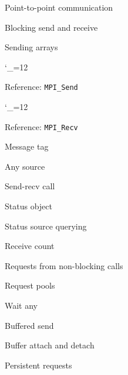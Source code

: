 \documentclass[11pt,headernav]{beamer}
\newcommand\referenceframe{\begingroup\catcode`\_=12 \referenceframett}
\gdef\referenceframett#1{
  \begin{numberedframe}{Reference: \texttt{MPI_#1}}
    \small
    
  \end{numberedframe}\endgroup}
\begin{document}
 {Point-to-point communication}

\begin{numberedframe}{Blocking send and receive}
  
\end{numberedframe}
\begin{numberedframe}{Sending arrays}
  
\end{numberedframe}
\referenceframe{Send}
\referenceframe{Recv}
\begin{numberedframe}{Message tag}
  
\end{numberedframe}
\begin{numberedframe}{Any source}
  
\end{numberedframe}
\begin{numberedframe}{Send-recv call}
  
\end{numberedframe}
\begin{numberedframe}{Status object}
  
\end{numberedframe}
\begin{numberedframe}{Status source querying}
  
\end{numberedframe}
\begin{numberedframe}{Receive count}
  
\end{numberedframe}

\begin{numberedframe}{Requests from non-blocking calls}
  
\end{numberedframe}
\begin{numberedframe}{Request pools}
  
\end{numberedframe}
\begin{numberedframe}{Wait any}
  
\end{numberedframe}
\begin{exerciseframe}[setdiff]
  
\end{exerciseframe}

\begin{numberedframe}{Buffered send}
  
\end{numberedframe}
\begin{numberedframe}{Buffer attach and detach}
  
\end{numberedframe}
\begin{numberedframe}{Persistent requests}
  
\end{numberedframe}
\end{document}

